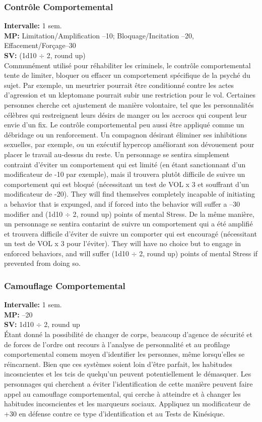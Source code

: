 \subsubsection{Contrôle Comportemental} \textbf{Intervalle:} 1 sem. \\ \textbf{MP:} Limitation/Amplification –10; Bloquage/Incitation –20, Effacement/Forçage–30 \\ \textbf{SV:} (1d10 $\div$ 2, round up) \\ Communément utilisé pour réhabiliter les criminels, le contrôle comportemental tente de limiter, bloquer ou effacer un comportement spécifique de la psyché du sujet. Par exemple, un meurtrier pourrait être conditionné contre les actes d'agression et un kleptomane pourrait subir une restriction pour le vol. Certaines personnes cherche cet ajustement de manière volontaire, tel que les personnalités célèbres qui restreignent leurs désirs de manger ou les accrocs qui coupent leur envie d'un fix. Le contrôle comportemental peu aussi être appliqué comme un débridage ou un renforcement. Un compagnon désirant éliminer ses inhibitions sexuelles, par exemple, ou un exécutif hypercop améliorant son dévouement pour placer le travail au-dessus du reste. Un personnage se sentira simplement contraint d'éviter un comportement qui est limité (en étant sanctionnant d'un modificateur de -10 par exemple), mais il trouvera plutôt difficile de suivre un comportement qui est bloqué (nécessitant un test de VOL x 3 et souffrant d'un modificateur de -20). They will find themselves completely incapable of initiating a behavior that is expunged, and if forced into the behavior will suffer a –30 modifier and (1d10 $\div$ 2, round up) points of mental Stress. De la même manière, un personnage se sentira contarint de suivre un comportement qui a été amplifié et trouvera difficile d'éviter de suivre un comporter qui est encouragé (nécessitant un test de VOL x 3 pour l'éviter). They will have no choice but to engage in enforced behaviors, and will suffer (1d10 $\div$ 2, round up) points of mental Stress if prevented from doing so. 

\subsubsection{Camouflage Comportemental} \textbf{Intervalle:} 1 sem. \\ \textbf{MP:} –20 \\ \textbf{SV:} 1d10 $\div$ 2, round up \\ Étant donné la possibilité de changer de corps, beaucoup d'agence de sécurité et de forces de l'ordre ont recours à l'analyse de personnalité et au profilage comportemental comem moyen d'identifier les personnes, même lorsqu'elles se réincarnent. Bien que ces systèmes soient loin d'être parfait, les habitudes incosncientes et les tcis de quelqu'un peuvent potentiellement le démasquer. Les personnages qui cherchent a éviter l'identification de cette manière peuvent faire appel au camouflage comportemental, qui cerche à atteindre et à changer les habitudes incosncientes et les marqueurs sociaux. Appliquez un modificateur de +30 en défense contre ce type d'identification et au Tests de Kinésique. 

